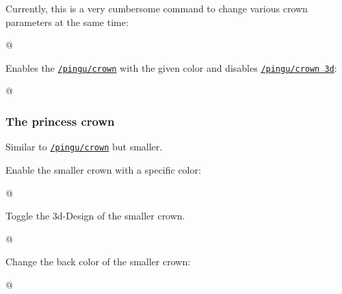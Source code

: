 \documentclass[parskip=half,english,numbers=noenddot,footnotes=nomultiple,oneside]{scrartcl}
\def\lpingu#1{\lstinline[style=lstpingu,language=pingulang]'#1'}
\newcommand*\keyref[2][/pingu/]{\hyperref[pk:#1#2]{\lpingu{#1#2}}}
\begin{document}
Currently, this is a very cumbersome command to change various crown parameters at the same time:
\begin{tcblisting}{@}
\begin{tikzpicture}
	\pingu[crown, eyes wink,
		crown position={1:(-.1cm,-.275cm){1.33}}]
\end{tikzpicture}
\end{tcblisting}
\endsubkeyexplain

Enables the \keyref{crown} with the given color and disables \keyref{crown 3d}:
\begin{tcblisting}{@}
\begin{tikzpicture}
	\pingu[crown 2d=green]
\end{tikzpicture}
\end{tcblisting}
\endkeyexplain

\subsubsection{The princess crown}
Similar to \keyref{crown} but smaller.

Enable the smaller crown with a specific color:
\begin{tcblisting}{@}
\begin{tikzpicture}
	\pingu[princess crown=green]
\end{tikzpicture}
\end{tcblisting}
\endshowkeyexplain

Toggle the 3d-Design of the smaller crown.
\begin{tcblisting}{@}
\begin{tikzpicture}
	\pingu[princess crown, princess crown 3d=false]
\end{tikzpicture}
\end{tcblisting}
\endsubkeyexplain

{\def\pingu@color@princesscrown{<princess-crown-color>}
Change the back color of the smaller crown:
\begin{tcblisting}{@}
\begin{tikzpicture}
	\pingu[princess crown, princess crown back=green]
\end{tikzpicture}
\end{tcblisting}
\endsubkeyexplain}
\end{document}
